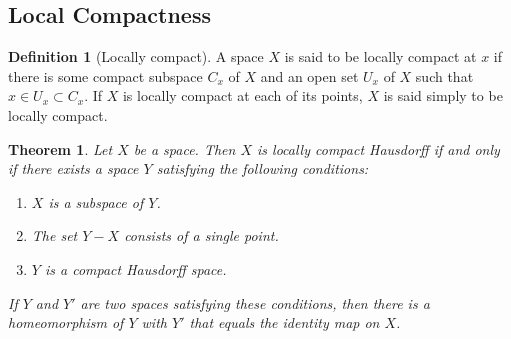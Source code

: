 \documentclass[12pt,reqno]{amsart}
\theoremstyle{plain}
\newtheorem{thm}{Theorem}
\theoremstyle{definition}
\newtheorem{defn}{Definition}
\begin{document}
\subsection{Local Compactness}
\begin{defn}[Locally compact]
    A space $X$ is said to be locally compact at $x$ if there is some compact subspace $C_x$ of $X$ and an open set $U_x$ of $X$ such that $x \in U_x \subset C_x$. If $X$ is locally compact at each of its points, $X$ is said simply to be locally compact.
\end{defn}
\begin{thm}
    Let $X$ be a space. Then $X$ is locally compact Hausdorff if and only if there exists a space $Y$ satisfying the following conditions:
    \begin{enumerate}
        \item $X$ is a subspace of $Y$.
        \item The set $Y-X$ consists of a single point.
        \item $Y$ is a compact Hausdorff space.
    \end{enumerate}
    If $Y$ and $Y'$ are two spaces satisfying these conditions, then there is a homeomorphism of $Y$ with $Y'$ that equals the identity map on $X$.
\end{thm}
\end{document}
